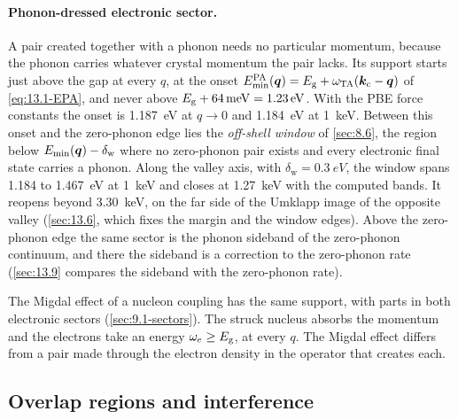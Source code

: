 \paragraph{Phonon-dressed electronic sector.} A pair created together with a phonon needs no particular momentum, because the phonon carries whatever crystal momentum the pair lacks. Its support starts just above the gap at every $q$, at the onset $E^{\mathrm{PA}}_{\mathrm{min}}(\bm{q}) = E_{\mathrm{g}} + \omega_{\mathrm{TA}}(\bm{k}_{\mathrm{c}} - \bm{q})$ of \cref{eq:13.1-EPA}, and never above $E_{\mathrm{g}} + \SI{64}{meV} = \SI{1.23}{eV}$. With the PBE force constants the onset is \SI{1.187}{eV} at $q \to 0$ and \SI{1.184}{eV} at \SI{1}{keV}. Between this onset and the zero-phonon edge lies the \emph{off-shell window} of \cref{sec:8.6}, the region below $E_{\mathrm{min}}(\bm{q}) - \delta_{\mathrm{w}}$ where no zero-phonon pair exists and every electronic final state carries a phonon. Along the valley axis, with $\delta_{\mathrm{w}} = \SI{0.3}{eV}$, the window spans 1.184 to \SI{1.467}{eV} at \SI{1}{keV} and closes at \SI{1.27}{keV} with the computed bands. It reopens beyond \SI{3.30}{keV}, on the far side of the Umklapp image of the opposite valley (\cref{sec:13.6}, which fixes the margin and the window edges). Above the zero-phonon edge the same sector is the phonon sideband of the zero-phonon continuum, and there the sideband is a correction to the zero-phonon rate (\cref{sec:13.9} compares the sideband with the zero-phonon rate).

The Migdal effect of a nucleon coupling has the same support, with parts in both electronic sectors (\cref{sec:9.1-sectors}). The struck nucleus absorbs the momentum and the electrons take an energy $\omega_e \ge E_{\mathrm{g}}$, at every $q$. The Migdal effect differs from a pair made through the electron density in the operator that creates each.

\subsection{Overlap regions and interference}\label{sec:9.3-overlap}

